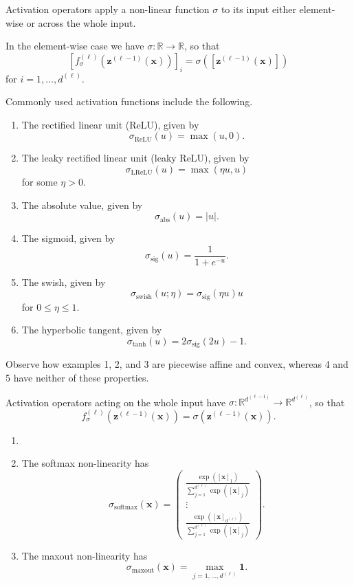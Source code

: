 Activation operators apply a non-linear function $\sigma$ to its input either element-wise or across the whole input. 

In the element-wise case we have $\sigma:\mathbb{R}\to\mathbb{R}$, so that $$\left[f_{\sigma}^{(\ell)}\left(\mathbf{z}^{(\ell-1)}(\mathbf{x})\right)\right]_i=\sigma\left(\left[\mathbf{z}^{(\ell-1)}(\mathbf{x})\right]\right)$$for $i=1,\dots,d^{(\ell)}$.

\begin{example}
    Commonly used activation functions include the following.
    \begin{enumerate}
        \item The rectified linear unit (ReLU), given by $$\sigma_{\text{ReLU}}(u)=\max(u,0).$$
        \item The leaky rectified linear unit (leaky ReLU), given by $$\sigma_{\text{LReLU}}(u)=\max(\eta u,u)$$for some $\eta>0$.
        \item The absolute value, given by $$\sigma_{\text{abs}}(u)=\vert u\vert.$$
        \item The sigmoid, given by $$\sigma_{\text{sig}}(u)=\frac{1}{1+e^{-u}}.$$
        \item The swish, given by $$\sigma_{\text{swish}}(u;\eta)=\sigma_{\text{sig}}\left(\eta u\right)u$$for $0\leq\eta\leq1$.
        \item The hyperbolic tangent, given by $$\sigma_{\text{tanh}}(u)=2\sigma_{\text{sig}}(2u)-1.$$
    \end{enumerate}
    Observe how examples 1, 2, and 3 are piecewise affine and convex, whereas 4 and 5 have neither of these properties.
\end{example}

Activation operators acting on the whole input have $\sigma:\mathbb{R}^{d^{(\ell-1)}}\to\mathbb{R}^{d^{(\ell)}}$, so that $$f^{(\ell)}_{\sigma}\left(\mathbf{z}^{(\ell-1)}(\mathbf{x})\right)=\sigma\left(\mathbf{z}^{(\ell-1)}(\mathbf{x})\right).$$

\begin{example}
    \begin{enumerate}
        \item[]
        \item The softmax non-linearity has $$\sigma_{\text{softmax}}\left(\mathbf{x}\right)=\begin{pmatrix}\frac{\exp\left(\left[\mathbf{x}\right]_1\right)}{\sum_{j=1}^{d^{(\ell)}}\exp\left(\left[\mathbf{x}\right]_j\right)}\\\vdots\\\frac{\exp\left(\left[\mathbf{x}\right]_{d^{(\ell)}}\right)}{\sum_{j=1}^{d^{(\ell)}}\exp\left(\left[\mathbf{x}\right]_j\right)}\end{pmatrix}.$$
        \item The maxout non-linearity has $$\sigma_{\text{maxout}}\left(\mathbf{x}\right)=\max_{j=1,\dots,d^{(\ell)}}\mathbf{1}.$$
    \end{enumerate}
\end{example}

